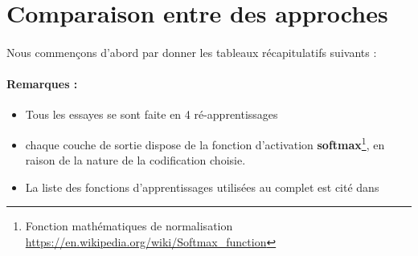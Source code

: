 \newpage
\section{Comparaison entre des approches}
\paragraph{}Nous commençons d'abord par donner les tableaux récapitulatifs suivants :
\paragraph{Remarques : }
\begin{itemize}
	\item Tous les essayes se sont faite en 4 ré-apprentissages 
	\item chaque couche de sortie dispose de la fonction d'activation \textbf{softmax}\footnote{Fonction mathématiques de normalisation \url{https://en.wikipedia.org/wiki/Softmax_function}}, en raison de la nature de la codification choisie.
	\item La liste des fonctions d'apprentissages utilisées au complet est cité dans \cite{KerasOpt}
\end{itemize}
\begin{table}[H]
	\centering
	\label{zeros}
	\caption{Meilleures architectures sur les données de teste pour l'approche naïve (\ref{naiveApproache}) avec partitionnement aléatoire(\ref{randomPartLearning})}
\end{table}
